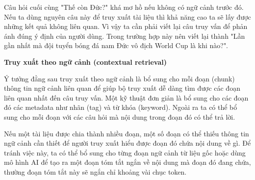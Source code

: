 Câu hỏi cuối cùng "Thế còn Đức?" khá mơ hồ nếu không có ngữ cảnh trước đó. Nếu ta dùng nguyên câu này để truy xuất tài liệu thì khả năng cao ta sẽ lấy được những kết quả không liên quan. Vì vậy ta cần phải viết lại câu truy vấn để phản ánh đúng ý định của người dùng. Trong trường hợp này nên viết lại thành "Lần gần nhất mà đội tuyển bóng đá nam Đức vô địch World Cup là khi nào?".

\vspace{1em}
\textbf{Truy xuất theo ngữ cảnh (contextual retrieval)}

Ý tưởng đằng sau truy xuất theo ngữ cảnh là bổ sung cho mỗi đoạn (chunk) thông tin ngữ cảnh liên quan để giúp bộ truy xuất dễ dàng tìm được các đoạn liên quan nhất đến câu truy vấn. Một kỹ thuật đơn giản là bổ sung cho các đoạn đó các metadata như nhãn (tag) và từ khóa (keyword). Ngoài ra ta có thể bổ sung cho mỗi đoạn với các câu hỏi mà nội dung trong đoạn đó có thể trả lời. 

Nếu một tài liệu được chia thành nhiều đoạn, một số đoạn có thể thiếu thông tin ngữ cảnh cần thiết để người truy xuất hiểu được đoạn đó chứa nội dung về gì. Để tránh việc này, ta có thể bổ sung cho từng đoạn ngữ cảnh từ liệu gốc hoặc dùng mô hình AI để tạo ra một đoạn tóm tắt ngắn về nội dung mà đoạn đó đang chứa, thường đoạn tóm tắt này sẽ ngắn chỉ khoảng vài chục token.